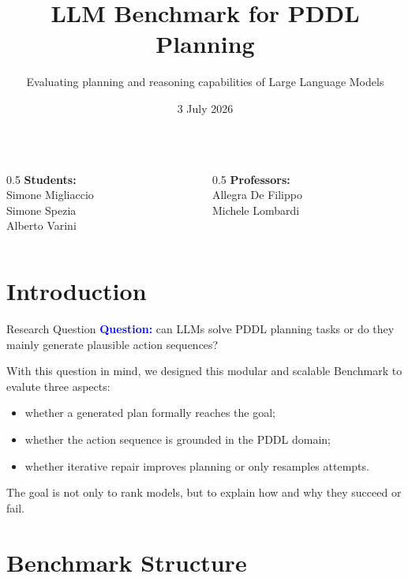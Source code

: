 \documentclass{beamer}
\title[LLM Benchmark]{LLM Benchmark for PDDL Planning}
\subtitle{Evaluating planning and reasoning capabilities of Large Language Models}
\date{3 July 2026}
\begin{document}
\begin{frame}
    \titlepage
    \vspace{-0.4cm}
    \begin{columns}
        \begin{column}{0.5\textwidth}
            \centering
            \textbf{Students:}\\
            Simone Migliaccio\\
            Simone Spezia\\
            Alberto Varini
        \end{column}
        \begin{column}{0.5\textwidth}
            \centering
            \textbf{Professors:}\\
            Allegra De Filippo\\
            Michele Lombardi
        \end{column}
    \end{columns}
\end{frame}

\section{Introduction}

\begin{frame}{Research Question}\footnotesize
    \textcolor{blue}{\textbf{Question:}} can LLMs solve PDDL planning tasks or do they mainly generate plausible action sequences?

    \vspace{0.4cm}
    With this question in mind, we designed this modular and scalable Benchmark to evalute three aspects:
    \begin{itemize}
        \item whether a generated plan formally reaches the goal;
        \item whether the action sequence is grounded in the PDDL domain;
        \item whether iterative repair improves planning or only resamples attempts.
    \end{itemize}

    The goal is not only to rank models, but to explain how and why they succeed or fail.
\end{frame}

\section{Benchmark Structure}
\end{document}
